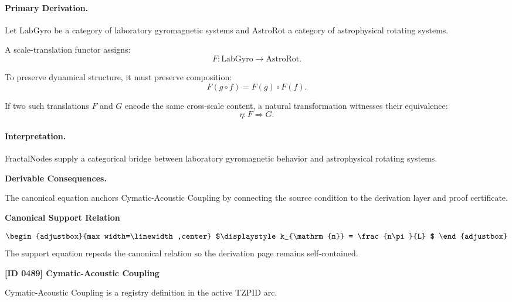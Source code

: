 \paragraph{Primary Derivation.}
Let $\mathrm{LabGyro}$ be a category of laboratory gyromagnetic systems and $\mathrm{AstroRot}$ a category of astrophysical rotating systems.

A scale-translation functor assigns:
\begin{equation}
F:\mathrm{LabGyro}\to\mathrm{AstroRot}.
\end{equation}

To preserve dynamical structure, it must preserve composition:
\begin{equation}
F(g\circ f)=F(g)\circ F(f).
\end{equation}

If two such translations $F$ and $G$ encode the same cross-scale content, a natural transformation witnesses their equivalence:
\begin{equation}
\boxed{
\eta:F\Rightarrow G .
}
\end{equation}

\paragraph{Interpretation.}
FractalNodes supply a categorical bridge between laboratory gyromagnetic behavior and astrophysical rotating systems.

\par\vspace{0.35em}
\noindent\textbf{Derivable Consequences.}\quad
\begingroup
\footnotesize
\raggedright
The canonical equation anchors Cymatic-Acoustic Coupling by connecting the source condition to the derivation layer and proof certificate.
\par\endgroup

\noindent\textbf{Canonical Support Relation}\par
\[
\begin{adjustbox}{max width=\linewidth,center}
$\displaystyle
k_{\mathrm{n}} = \frac{n\pi}{L}
$
\end{adjustbox}
\]
\noindent The support equation repeats the canonical relation so the derivation page remains self-contained.\par

\clearpage
\noindent\textbf{[ID 0489] Cymatic-Acoustic Coupling}\par
\vspace{0.35em}
\begingroup\small
{}
Cymatic-Acoustic Coupling is a registry definition in the active TZPID arc.


